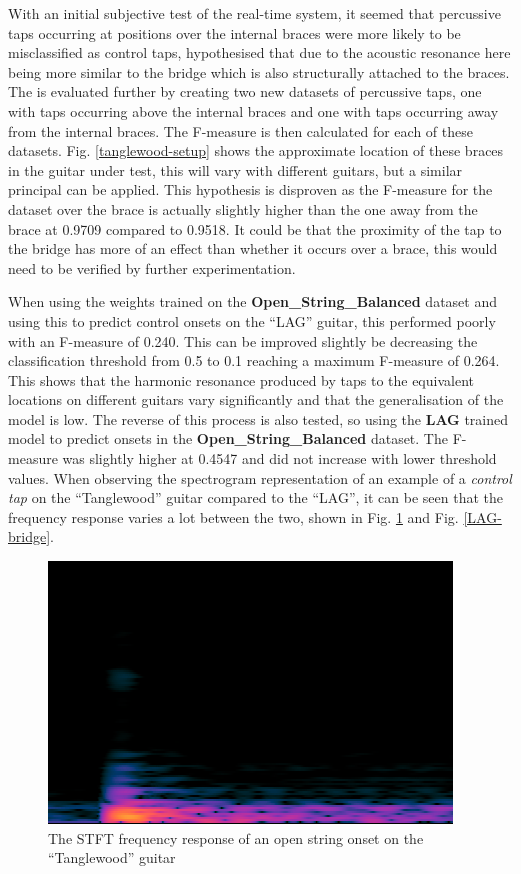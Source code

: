 \documentclass[conference]{IEEEtran}
\begin{document}
With an initial subjective test of the real-time system, it seemed that percussive taps occurring at positions over the internal braces were more likely to be misclassified as control taps, hypothesised that due to the acoustic resonance here being more similar to the bridge which is also structurally attached to
the braces. The is evaluated further by creating two new datasets of percussive taps, one with taps occurring above the internal braces and one with taps occurring away from the internal braces. The F-measure is then calculated for each of these datasets.
Fig. \ref{tanglewood-setup} shows the approximate location of these braces in the guitar under test, this will vary with different guitars, but a similar principal can be applied. This hypothesis is disproven as the F-measure for the dataset over the brace is actually slightly higher than the 
one away from the brace at 0.9709 compared to 0.9518. It could be that the proximity of the tap to the bridge has more of an effect than whether it occurs over a brace, this would need to be verified by further experimentation. 

When using the weights trained on the \textbf{Open\_String\_Balanced} dataset and using this to predict control onsets on the ``LAG'' guitar, this performed poorly with an F-measure of 0.240. This can be improved slightly be decreasing the classification threshold from 0.5 to 0.1 reaching
a maximum F-measure of 0.264. This shows that the harmonic resonance produced by taps to the equivalent locations on different guitars vary significantly and that the generalisation of the model is low. The reverse of this process is also tested, so using the \textbf{LAG} trained model to predict
onsets in the \textbf{Open\_String\_Balanced} dataset. The F-measure was slightly higher at 0.4547 and did not increase with lower threshold values. When observing the spectrogram representation of an example of a \emph{control tap} on the ``Tanglewood'' guitar compared to the ``LAG'',
it can be seen that the frequency response varies a lot between the two, shown in Fig. \ref{acoustic-bridge} and Fig. \ref{LAG-bridge}.

\begin{figure}[htbp]
    \centerline{\includegraphics[scale=0.4]{acoustic-bridge.png}}
    \caption{The STFT frequency response of an open string onset on the ``Tanglewood'' guitar}
    \label{acoustic-bridge}
    \end{figure}
\end{document}
